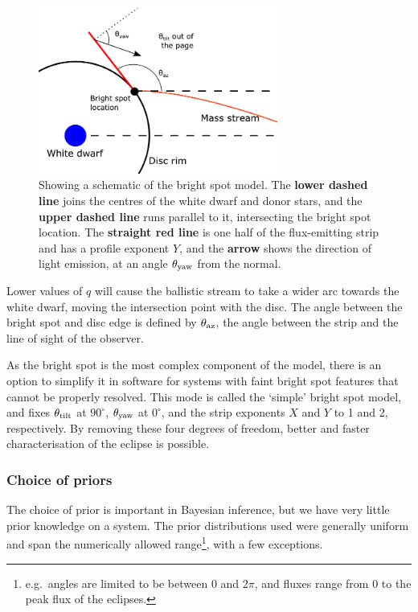 \begin{figure}
    \centering
    \includegraphics[width=0.7\textwidth]{figures/modelling/bright_spot_schematic.pdf}
    \caption{Showing a schematic of the bright spot model. The {\bf lower dashed line} joins the centres of the white dwarf and donor stars, and the {\bf upper dashed line} runs parallel to it, intersecting the bright spot location. The {\bf straight red line} is one half of the flux-emitting strip and has a profile exponent $Y$, and the {\bf arrow} shows the direction of light emission, at an angle $\theta_{\rm yaw}$ from the normal.}
    \label{fig:modelling:bright spot schematic}
\end{figure}

Lower values of $q$ will cause the ballistic stream to take a wider arc towards the white dwarf, moving the intersection point with the disc. The angle between the bright spot and disc edge is defined by $\theta_{\rm az}$, the angle between the strip and the line of sight of the observer.

As the bright spot is the most complex component of the model, there is an option to simplify it in software for systems with faint bright spot features that cannot be properly resolved.
This mode is called the `simple' bright spot model, and fixes $\theta_{\rm tilt}$ at $90^\circ$, $\theta_{\rm yaw}$ at $0^\circ$, and the strip exponents $X$ and $Y$ to 1 and 2, respectively. By removing these four degrees of freedom, better and faster characterisation of the eclipse is possible.

\subsubsection{Choice of priors}

The choice of prior is important in Bayesian inference, but we have very little prior knowledge on a system. The prior distributions used were generally uniform and span the numerically allowed range\footnote{e.g.\ angles are limited to be between 0 and $2\pi$, and fluxes range from 0 to the peak flux of the eclipses.}, with a few exceptions.

